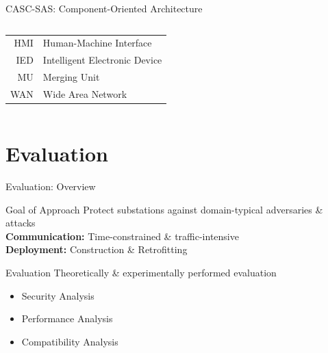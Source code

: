 \documentclass[en]{sdqbeamer}
\begin{document}
\begin{frame}{CASC-SAS: Component-Oriented Architecture}
\begin{columns}
\begin{center}
\begin{tabular}{r l}
                \color{SteelBlue} HMI & \color{SteelBlue} Human-Machine Interface \\
                \color{SteelBlue} IED & \color{SteelBlue} Intelligent Electronic Device \\
                \color{SteelBlue} MU & \color{SteelBlue} Merging Unit \\
                \color{SteelBlue} WAN & \color{SteelBlue} Wide Area Network
            \end{tabular}
        \end{center}
    \end{columns}
\end{frame}

\section{Evaluation}
\begin{frame}{Evaluation: Overview}
    \begin{greenblock}{Goal of Approach}
        Protect substations against domain-typical adversaries \& attacks
        \\\textbf{Communication:} Time-constrained \& traffic-intensive
        \\\textbf{Deployment:} Construction \& Retrofitting
    \end{greenblock}
    \begin{blueblock}{Evaluation}
        Theoretically \& experimentally performed evaluation
        \begin{itemize}
            \item Security Analysis
            \item Performance Analysis
            \item Compatibility Analysis
        \end{itemize}
    \end{blueblock}
\end{frame}
\end{document}
